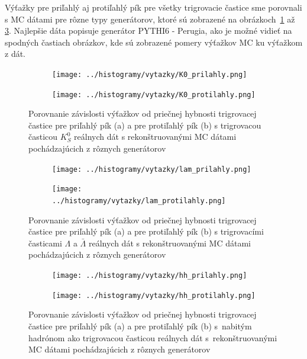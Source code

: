 \documentclass[thesismargins, thesislinespacing]{rnthesis}
\begin{document}
Výťažky pre priľahlý aj protiľahlý pík pre všetky trigrovacie častice sme porovnali s MC dátami pre rôzne typy generátorov, ktoré sú zobrazené na obrázkoch~\ref{porovnanie} až \ref{porovnanieh}. Najlepšie dáta popisuje generátor PYTHI6 - Perugia, ako je možné vidieť na spodných častiach obrázkov, kde sú zobrazené pomery výťažkov MC ku výťažkom z dát.

\begin{figure}[hbtp!]
	\centering
	\begin{subfigure}{0.5\textwidth}
		\centering
		\texttt{[image: ../histogramy/vytazky/K0\_prilahly.png]}
		\caption{}
	\end{subfigure}%
	\begin{subfigure}{0.5\textwidth}
		\centering
		\texttt{[image: ../histogramy/vytazky/K0\_protilahly.png]}
		\caption{}
	\end{subfigure}
	\caption{Porovnanie závislosti výťažkov od priečnej hybnosti trigrovacej častice pre priľahlý pík (a) a pre protiľahlý pík (b) s trigrovacou časticou $K^0_S$ reálnych dát s rekonštruovanými MC dátami pochádzajúcich z rôznych generátorov}
	\label{porovnanie}
\end{figure}

\begin{figure}[hbtp!]
	\centering
\begin{subfigure}{0.5\textwidth}
	\centering
	\texttt{[image: ../histogramy/vytazky/lam\_prilahly.png]}
	\caption{}
\end{subfigure}%
\begin{subfigure}{0.5\textwidth}
	\centering
	\texttt{[image: ../histogramy/vytazky/lam\_protilahly.png]}
	\caption{}
\end{subfigure}
	\caption{Porovnanie závislosti výťažkov od priečnej hybnosti trigrovacej častice pre priľahlý pík (a) a pre protiľahlý pík (b) s trigrovacími časticami $\Lambda$ a $\bar{\Lambda}$ reálnych dát s rekonštruovanými MC dátami pochádzajúcich z rôznych generátorov}
	\label{porovnanieL}
\end{figure}

\begin{figure}[hbtp!]
	\centering
	\begin{subfigure}{0.5\textwidth}
		\centering
		\texttt{[image: ../histogramy/vytazky/hh\_prilahly.png]}
		\caption{}
	\end{subfigure}%
	\begin{subfigure}{0.5\textwidth}
		\centering
		\texttt{[image: ../histogramy/vytazky/hh\_protilahly.png]}
		\caption{}
	\end{subfigure}
	\caption{Porovnanie závislosti výťažkov od priečnej hybnosti trigrovacej častice pre priľahlý pík (a) a pre protiľahlý pík (b) s~nabitým hadrónom ako trigrovacou časticou reálnych dát s~rekonštruovanými MC dátami pochádzajúcich z rôznych generátorov}
	\label{porovnanieh}
\end{figure}
\end{document}
